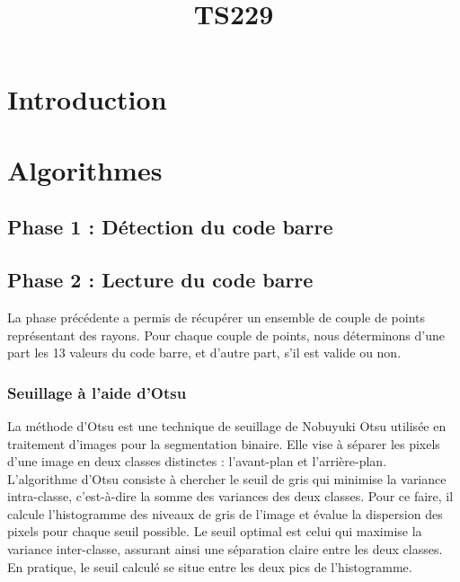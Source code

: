 \documentclass{rapport}
\title{TS229}
\begin{document}

\fairemarges %
\fairepagedegarde %
\newpage
\tabledematieres %
\newpage

\section{Introduction}

\section{Algorithmes}

\subsection{Phase 1 : Détection du code barre}
\subsection{Phase 2 : Lecture du code barre}

La phase précédente a permis de récupérer un ensemble de couple de points représentant des rayons. 
Pour chaque couple de points, nous déterminons d'une part les 13 valeurs du code barre, et d'autre part, s'il est valide ou non.

\subsubsection*{Seuillage à l'aide d'Otsu}
La méthode d'Otsu est une technique de seuillage de Nobuyuki Otsu utilisée en traitement d'images pour la segmentation binaire. 
Elle vise à séparer les pixels d'une image en deux classes distinctes : l'avant-plan et l'arrière-plan. 
L'algorithme d'Otsu consiste à chercher le seuil de gris qui minimise la variance intra-classe, c'est-à-dire la somme des variances des deux classes. 
Pour ce faire, il calcule l'histogramme des niveaux de gris de l'image et évalue la dispersion des pixels pour chaque seuil possible. 
Le seuil optimal est celui qui maximise la variance inter-classe, assurant ainsi une séparation claire entre les deux classes. 
En pratique, le seuil calculé se situe entre les deux pics de l'histogramme.
\end{document}
